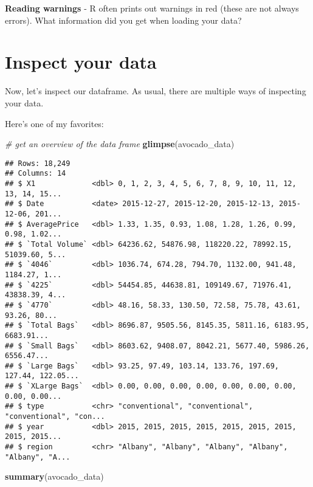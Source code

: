 \documentclass[]{book}
\newenvironment{Shaded}{\begin{snugshade}}{\end{snugshade}}
\newcommand{\CommentTok}[1]{\textcolor[rgb]{0.56,0.35,0.01}{\textit{#1}}}
\newcommand{\KeywordTok}[1]{\textcolor[rgb]{0.13,0.29,0.53}{\textbf{#1}}}
\newcommand{\NormalTok}[1]{#1}
\begin{document}
\textbf{Reading warnings} - R often prints out warnings in red (these are not always errors). What information did you get when loading your data?

\hypertarget{inspect-your-data}{%
\section{Inspect your data}\label{inspect-your-data}}

Now, let's inspect our dataframe. As usual, there are multiple ways of inspecting your data.

Here's one of my favorites:

\begin{Shaded}
\begin{Highlighting}[]
\CommentTok{# get an overview of the data frame}
\KeywordTok{glimpse}\NormalTok{(avocado_data)}
\end{Highlighting}
\end{Shaded}

\begin{verbatim}
## Rows: 18,249
## Columns: 14
## $ X1             <dbl> 0, 1, 2, 3, 4, 5, 6, 7, 8, 9, 10, 11, 12, 13, 14, 15...
## $ Date           <date> 2015-12-27, 2015-12-20, 2015-12-13, 2015-12-06, 201...
## $ AveragePrice   <dbl> 1.33, 1.35, 0.93, 1.08, 1.28, 1.26, 0.99, 0.98, 1.02...
## $ `Total Volume` <dbl> 64236.62, 54876.98, 118220.22, 78992.15, 51039.60, 5...
## $ `4046`         <dbl> 1036.74, 674.28, 794.70, 1132.00, 941.48, 1184.27, 1...
## $ `4225`         <dbl> 54454.85, 44638.81, 109149.67, 71976.41, 43838.39, 4...
## $ `4770`         <dbl> 48.16, 58.33, 130.50, 72.58, 75.78, 43.61, 93.26, 80...
## $ `Total Bags`   <dbl> 8696.87, 9505.56, 8145.35, 5811.16, 6183.95, 6683.91...
## $ `Small Bags`   <dbl> 8603.62, 9408.07, 8042.21, 5677.40, 5986.26, 6556.47...
## $ `Large Bags`   <dbl> 93.25, 97.49, 103.14, 133.76, 197.69, 127.44, 122.05...
## $ `XLarge Bags`  <dbl> 0.00, 0.00, 0.00, 0.00, 0.00, 0.00, 0.00, 0.00, 0.00...
## $ type           <chr> "conventional", "conventional", "conventional", "con...
## $ year           <dbl> 2015, 2015, 2015, 2015, 2015, 2015, 2015, 2015, 2015...
## $ region         <chr> "Albany", "Albany", "Albany", "Albany", "Albany", "A...
\end{verbatim}

\begin{Shaded}
\begin{Highlighting}[]
\KeywordTok{summary}\NormalTok{(avocado_data)}
\end{Highlighting}
\end{Shaded}
\end{document}
